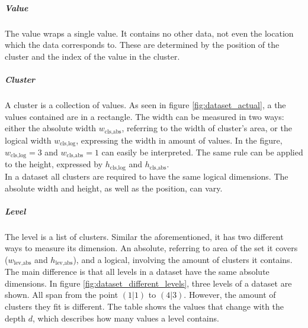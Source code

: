 \documentclass[10pt,a4paper,titlepage]{article}
\begin{document}
	\subparagraph{Value}
	The value wraps a single value. It contains no other data, not even the location which the data corresponds to. These are determined by the position of the cluster and the index of the value in the cluster.
	\subparagraph{Cluster}
	A cluster is a collection of values. As seen in figure \ref{fig:dataset_actual}, a the values contained are in a rectangle. The width can be measured in two ways: either the absolute width \(w_{\text{cls,abs}}\), referring to the width of cluster's area, or the logical width \(w_{\text{cls,log}}\), expressing the width in amount of values. In the figure, \(w_{\text{cls,log}} = 3\) and \(w_{\text{cls,abs}} = 1\) can easily be interpreted. The same rule can be applied to the height, expressed by \(h_{\text{cls,log}}\) and \(h_{\text{cls,abs}}\).\\
	In a dataset all clusters are required to have the same logical dimensions. The absolute width and height, as well as the position, can vary.
	\subparagraph{Level}
	The level is a list of clusters. Similar the aforementioned, it has two different ways to measure its dimension. An absolute, referring to area of the set it covers (\(w_{\text{lev,abs}}\) and \(h_{\text{lev,abs}}\)), and a logical, involving the amount of clusters it contains. The main difference is that all levels in a dataset have the same absolute dimensions. In figure \ref{fig:dataset_different_levels}, three levels of a dataset are shown. All span from the point \((1|1)\) to \((4|3)\). However, the amount of clusters they fit is different. The table shows the values that change with the depth \(d\), which describes how many values a level contains.
\end{document}
